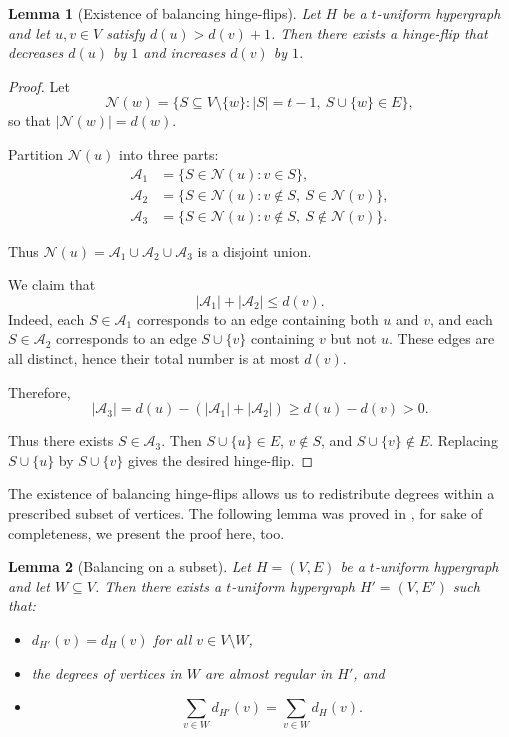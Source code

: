\documentclass[pdflatex,sn-mathphys-num]{sn-jnl}%
\theoremstyle{thmstyleone}%
\newtheorem{lemma}{Lemma}
\theoremstyle{thmstyletwo}%
\theoremstyle{thmstylethree}%
\begin{document}
\begin{lemma}[Existence of balancing hinge-flips]
Let $H$ be a $t$-uniform hypergraph and let $u,v \in V$ satisfy $d(u) > d(v)+1$. Then there exists a hinge-flip that decreases $d(u)$ by $1$ and increases $d(v)$ by $1$.
\end{lemma}

\begin{proof}
Let
\[
\mathcal{N}(w) = \{ S \subseteq V \setminus \{w\} : |S| = t-1,\ S \cup \{w\} \in E \},
\]
so that $|\mathcal{N}(w)| = d(w)$.

Partition $\mathcal{N}(u)$ into three parts:
\begin{align*}
\mathcal{A}_1 &= \{ S \in \mathcal{N}(u) : v \in S \}, \\
\mathcal{A}_2 &= \{ S \in \mathcal{N}(u) : v \notin S,\ S \in \mathcal{N}(v) \}, \\
\mathcal{A}_3 &= \{ S \in \mathcal{N}(u) : v \notin S,\ S \notin \mathcal{N}(v) \}.
\end{align*}

Thus $\mathcal{N}(u) = \mathcal{A}_1 \cup \mathcal{A}_2 \cup \mathcal{A}_3$ is a disjoint union.

We claim that
\[
|\mathcal{A}_1| + |\mathcal{A}_2| \le d(v).
\]
Indeed, each $S \in \mathcal{A}_1$ corresponds to an edge containing both $u$ and $v$, and each $S \in \mathcal{A}_2$ corresponds to an edge $S \cup \{v\}$ containing $v$ but not $u$. These edges are all distinct, hence their total number is at most $d(v)$.

Therefore,
\[
|\mathcal{A}_3| = d(u) - (|\mathcal{A}_1| + |\mathcal{A}_2|) \ge d(u) - d(v) > 0.
\]

Thus there exists $S \in \mathcal{A}_3$. Then $S \cup \{u\} \in E$, $v \notin S$, and $S \cup \{v\} \notin E$. Replacing $S \cup \{u\}$ by $S \cup \{v\}$ gives the desired hinge-flip.
\end{proof}

\noindent
The existence of balancing hinge-flips allows us to redistribute degrees within a prescribed subset of vertices. The following lemma was proved in \cite{MRZ}, for sake of completeness, we present the proof here, too.

\begin{lemma}[Balancing on a subset]\label{lem:balance_subset}
Let $H=(V,E)$ be a $t$-uniform hypergraph and let $W \subseteq V$. Then there exists a $t$-uniform hypergraph $H'=(V,E')$ such that:
\begin{itemize}
\item $d_{H'}(v) = d_H(v)$ for all $v \in V \setminus W$,
\item the degrees of vertices in $W$ are almost regular in $H'$, and
\item
\[
\sum_{v \in W} d_{H'}(v) = \sum_{v \in W} d_H(v).
\]
\end{itemize}
\end{lemma}
\end{document}

